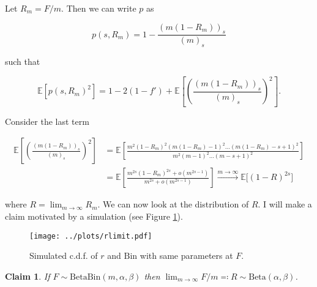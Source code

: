 \documentclass[american, abstract=on]{scrartcl}
\theoremstyle{plain}
\newtheorem{claim}{Claim}
\newcommand{\E}{\mathbb{E}}
\newcommand{\Beta}{\text{Beta}}
\newcommand{\Bin}{\text{Bin}}
\begin{document}
Let $R_m = F / m$. Then we can write $p$ as

\begin{equation}
    p(s, R_m) = 1 - \frac{(m(1- R_m))_s}{(m)_s}
\end{equation}

such that

\begin{equation}
   \E \left[p(s, R_m)^2\right] = 1 - 2(1 - f') + \E\left[\left(\frac{(m(1- R_m))_s}{(m)_s} \right)^2\right].
\end{equation}

Consider the last term

\begin{equation}
    \begin{split}
        \E\left[\left(\frac{(m(1- R_m))_s}{(m)_s} \right)^2\right] &= \E\left[ \frac{m^2 (1 - R_m)^2 (m (1 - R_m) - 1)^2 \ldots (m(1-R_m) - s + 1)^2}{m^2 (m - 1)^2 \ldots (m - s + 1)^2} \right] \\
        &= \E\left[\frac{m^{2s}(1- R_m)^{2s} + o(m^{2s - 1})}{m^{2s} + o(m^{2s - 1})}\right] \xrightarrow{m \rightarrow \infty} \E\Big[ (1 - R)^{2s} \Big]
    \end{split}
\end{equation}

where $R = \lim_{m \rightarrow \infty} R_m$. We can now look at the distribution of $R$. I will make a claim motivated by a simulation (see Figure \ref{fig:rdist}).


\begin{figure}[H]
    \centering
    \texttt{[image: ../plots/rlimit.pdf]} 
    \caption{Simulated c.d.f. of $r$ and $\Bin$ with same parameters at $F$.}
    \label{fig:rdist}    
\end{figure}

\begin{claim}
    If $F \sim \Beta\Bin(m, \alpha, \beta)$ then $\lim_{m \rightarrow \infty} F / m \eqqcolon R \sim \Beta(\alpha, \beta)$.
\end{claim}
\end{document}
